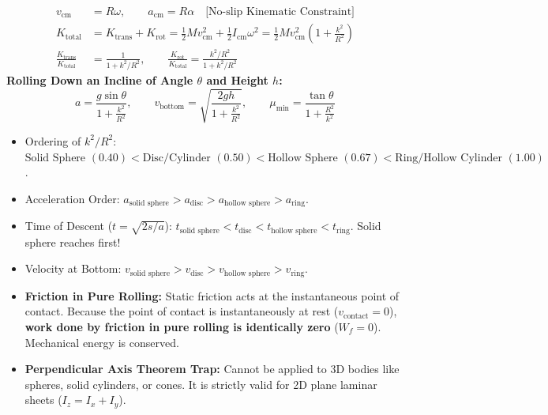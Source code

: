 \documentclass[11pt,a4paper]{article}
\begin{document}
\begin{formulabox}
\begin{align}
  v_{\text{cm}} &= R\omega, \qquad a_{\text{cm}} = R\alpha \quad \text{[No-slip Kinematic Constraint]} \\
  K_{\text{total}} &= K_{\text{trans}} + K_{\text{rot}} = \frac{1}{2}M v_{\text{cm}}^2 + \frac{1}{2}I_{\text{cm}}\omega^2 = \frac{1}{2}M v_{\text{cm}}^2\left(1 + \frac{k^2}{R^2}\right) \\
  \frac{K_{\text{trans}}}{K_{\text{total}}} &= \frac{1}{1 + k^2/R^2}, \qquad \frac{K_{\text{rot}}}{K_{\text{total}}} = \frac{k^2/R^2}{1 + k^2/R^2}
\end{align}
\textbf{Rolling Down an Incline of Angle $\theta$ and Height $h$:}
\begin{equation}
  a = \frac{g\sin\theta}{1 + \frac{k^2}{R^2}}, \qquad v_{\text{bottom}} = \sqrt{\frac{2gh}{1 + \frac{k^2}{R^2}}}, \qquad \mu_{\min} = \frac{\tan\theta}{1 + \frac{R^2}{k^2}}
\end{equation}
\end{formulabox}

\begin{usecasebox}
\begin{itemize}
  \item Ordering of $k^2/R^2$: $\text{Solid Sphere } (0.40) < \text{Disc/Cylinder } (0.50) < \text{Hollow Sphere } (0.67) < \text{Ring/Hollow Cylinder } (1.00)$.
  \item Acceleration Order: $a_{\text{solid sphere}} > a_{\text{disc}} > a_{\text{hollow sphere}} > a_{\text{ring}}$.
  \item Time of Descent ($t = \sqrt{2s/a}$): $t_{\text{solid sphere}} < t_{\text{disc}} < t_{\text{hollow sphere}} < t_{\text{ring}}$. Solid sphere reaches first!
  \item Velocity at Bottom: $v_{\text{solid sphere}} > v_{\text{disc}} > v_{\text{hollow sphere}} > v_{\text{ring}}$.
\end{itemize}
\end{usecasebox}

\begin{trapbox}
\begin{itemize}
  \item \textbf{Friction in Pure Rolling:} Static friction acts at the instantaneous point of contact. Because the point of contact is instantaneously at rest ($v_{\text{contact}} = 0$), \textbf{work done by friction in pure rolling is identically zero} ($W_f = 0$). Mechanical energy is conserved.
  \item \textbf{Perpendicular Axis Theorem Trap:} Cannot be applied to 3D bodies like spheres, solid cylinders, or cones. It is strictly valid for 2D plane laminar sheets ($I_z = I_x + I_y$).
\end{itemize}
\end{trapbox}
\end{document}
